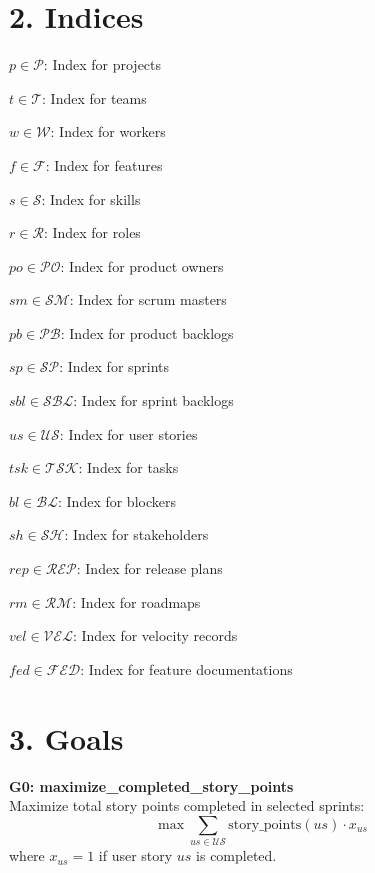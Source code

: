 \documentclass[12pt]{article}
\begin{document}
\section{2. Indices}
\item $ p \in \mathcal{P} $: Index for projects
    \item $ t \in \mathcal{T} $: Index for teams
    \item $ w \in \mathcal{W} $: Index for workers
    \item $ f \in \mathcal{F} $: Index for features
    \item $ s \in \mathcal{S} $: Index for skills
    \item $ r \in \mathcal{R} $: Index for roles
    \item $ po \in \mathcal{PO} $: Index for product owners
    \item $ sm \in \mathcal{SM} $: Index for scrum masters
    \item $ pb \in \mathcal{PB} $: Index for product backlogs
    \item $ sp \in \mathcal{SP} $: Index for sprints
    \item $ sbl \in \mathcal{SBL} $: Index for sprint backlogs
    \item $ us \in \mathcal{US} $: Index for user stories
    \item $ tsk \in \mathcal{TSK} $: Index for tasks
    \item $ bl \in \mathcal{BL} $: Index for blockers
    \item $ sh \in \mathcal{SH} $: Index for stakeholders
    \item $ rep \in \mathcal{REP} $: Index for release plans
    \item $ rm \in \mathcal{RM} $: Index for roadmaps
    \item $ vel \in \mathcal{VEL} $: Index for velocity records
    \item $ fed \in \mathcal{FED} $: Index for feature documentations

\section{3. Goals}
\item \textbf{G0: maximize\_completed\_story\_points} \\
    Maximize total story points completed in selected sprints:
    \[
    \max \sum_{us \in \mathcal{US}} \text{story\_points}(us) \cdot x_{us}
    \]
    where $ x_{us} = 1 $ if user story $ us $ is completed.
\end{document}

